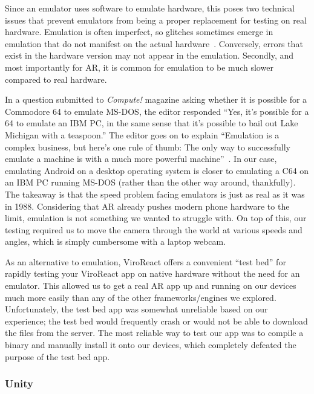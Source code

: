 \documentclass[a4paper, 10pt, american, titlepage]{article}
\begin{document}
Since an emulator uses software to emulate hardware, this poses two technical
issues that prevent emulators from being a proper replacement for testing on
real hardware. Emulation is often imperfect, so glitches sometimes emerge in
emulation that do not manifest on the actual hardware~\autocite{alzaylaee2017}.
Conversely, errors that exist in the hardware version may not appear in the
emulation. Secondly, and most importantly for AR, it is common for emulation to
be much slower compared to real hardware.

In a question submitted to \textit{Compute!} magazine asking whether it is
possible for a Commodore 64 to emulate MS-DOS, the editor responded ``Yes, it's
possible for a 64 to emulate an IBM PC, in the same sense that it's possible to
bail out Lake Michigan with a teaspoon.'' The editor goes on to explain
``Emulation is a complex business, but here's one rule of thumb: The only way
to successfully emulate a machine is with a much more powerful
machine''~\autocite{warick1988}. In our case, emulating Android on a desktop
operating system is closer to emulating a C64 on an IBM PC running MS-DOS
(rather than the other way around, thankfully). The takeaway is that the speed
problem facing emulators is just as real as it was in 1988. Considering that AR
already pushes modern phone hardware to the limit, emulation is not something we
wanted to struggle with. On top of this, our testing required us to move the
camera through the world at various speeds and angles, which is simply
cumbersome with a laptop webcam.

As an alternative to emulation, ViroReact offers a convenient ``test bed'' for
rapidly testing your ViroReact app on native hardware without the need for an
emulator. This allowed us to get a real AR app up and running on our devices
much more easily than any of the other frameworks/engines we explored.
Unfortunately, the test bed app was somewhat unreliable based on our
experience; the test bed would frequently crash or would not be able to
download the files from the server. The most reliable way to test our app was
to compile a binary and manually install it onto our devices, which completely
defeated the purpose of the test bed app.

\subsubsection{Unity}
\label{sec:unity}
\end{document}

